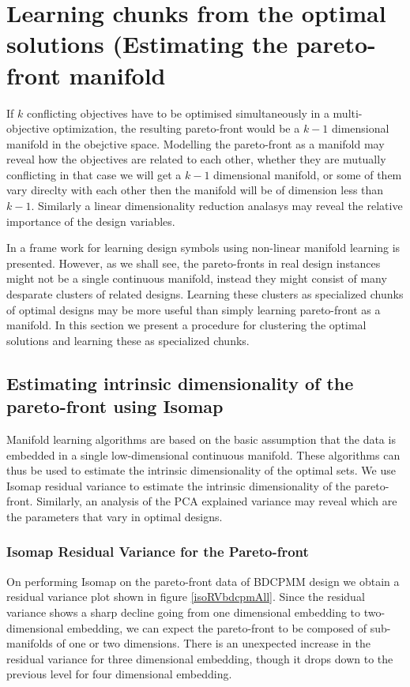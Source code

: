 \section{Learning chunks from the optimal solutions (Estimating the pareto-front manifold}
If $k$ conflicting objectives have to be optimised simultaneously in 
a multi-objective optimization, the resulting pareto-front would be a 
$k-1$ dimensional manifold in the obejctive space. Modelling the 
pareto-front as a manifold may reveal how the objectives are related 
to each other, whether they are mutually conflicting in that case we 
will get a $k-1$ dimensional manifold, or some of them vary direclty 
with each other then the manifold will be of dimension less than $k-1$.
Similarly a linear dimensionality reduction analasys may reveal the 
relative importance of the design variables.
  
In \cite{mukerjee2009} a frame work for learning design symbols 
using non-linear manifold learning is presented. However, as we shall 
see, the pareto-fronts in real design instances might not be a single 
continuous manifold, instead they might consist of many desparate 
clusters of related designs. Learning these clusters as specialized 
chunks of optimal designs may be more useful than simply learning 
pareto-front as a manifold. In this section we present a procedure for
clustering the optimal solutions and learning these as specialized 
chunks.

\subsection{Estimating intrinsic dimensionality of the pareto-front using Isomap}
Manifold learning algorithms are based on the basic assumption that
the data is embedded in a single low-dimensional continuous manifold.
These algorithms can thus be used to estimate the intrinsic 
dimensionality of the optimal sets. We use Isomap residual variance
to estimate the intrinsic dimensionality of the pareto-front. 
Similarly, an analysis of the PCA explained variance may reveal which 
are the parameters that vary in optimal designs.

\subsubsection{Isomap Residual Variance for the Pareto-front}
On performing Isomap on the pareto-front data of BDCPMM design we 
obtain a residual variance plot shown in figure \ref{isoRVbdcpmAll}. 
Since the residual variance shows a sharp decline going from one 
dimensional embedding to two-dimensional embedding, we can expect the 
pareto-front to be composed of sub-manifolds of one or two dimensions.
There is an unexpected increase in the residual variance for three 
dimensional embedding, though it drops down to the previous level for 
four dimensional embedding. 

